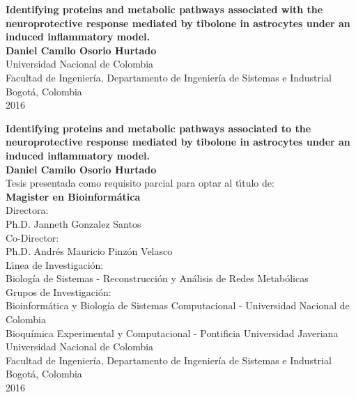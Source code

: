 \begin{center}
\begin{figure}
\centering%
%
\end{figure}
\thispagestyle{empty} \vspace*{2.0cm} \textbf{\huge
Identifying proteins and metabolic pathways associated with the neuroprotective response mediated by tibolone in astrocytes under an induced inflammatory model.}\\[3.0cm]
\Large\textbf{Daniel Camilo Osorio Hurtado}\\[6.0cm]
\small Universidad Nacional de Colombia\\
Facultad de Ingeniería, Departamento de Ingeniería de Sistemas e Industrial\\
Bogotá, Colombia\\
2016\\
\end{center}

\newpage{\pagestyle{empty}\cleardoublepage}

\newpage
\begin{center}
\thispagestyle{empty} \vspace*{0cm} \textbf{\huge
Identifying proteins and metabolic pathways associated to the neuroprotective response mediated by tibolone in astrocytes under an induced inflammatory model.}\\[2.0cm]
\Large\textbf{Daniel Camilo Osorio Hurtado}\\[2.0cm]
\small Tesis presentada como requisito parcial para optar al
t\'{\i}tulo de:\\
\textbf{Magister en Bioinformática}\\[1.5cm]
Directora:\\
Ph.D. Janneth Gonzalez Santos\\[0.7cm]
Co-Director:\\
Ph.D. Andrés Mauricio Pinzón Velasco\\[1.5cm]
L\'{\i}nea de Investigaci\'{o}n:\\
Biolog\'ia de Sistemas - Reconstrucción y Análisis de Redes Metab\'olicas \\
Grupos de Investigaci\'{o}n:\\
Bioinformática y Biología de Sistemas Computacional - Universidad Nacional de Colombia\\
Bioquímica Experimental y Computacional - Pontificia Universidad Javeriana \\[1.7cm]
Universidad Nacional de Colombia\\
Facultad de Ingeniería, Departamento de Ingeniería de Sistemas e Industrial\\
Bogotá, Colombia\\
2016
\end{center}
\newpage{\pagestyle{empty}\cleardoublepage}
